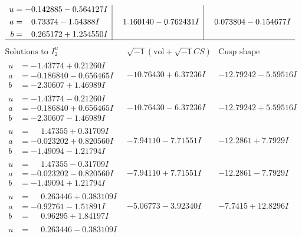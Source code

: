 \documentclass[1p]{elsarticle_modified}
\theoremstyle{definition}
\newcommand{\I}{\sqrt{-1}}
\begin{document}
$$\begin{array}{c|c|c}
\begin{aligned}
u &= -0.142885 - 0.564127 I \\
a &= \phantom{-}0.73374 - 1.54388 I \\
b &= \phantom{-}0.265172 + 1.254550 I\end{aligned}
 & \phantom{-}1.160140 - 0.762431 I & \phantom{-}0.073804 - 0.154677 I\\
 \hline 
 \end{array}$$\newpage$$\begin{array}{c|c|c}  
\text{Solutions to }I^u_{2}& \I (\text{vol} + \sqrt{-1}CS) & \text{Cusp shape}\\
 \hline 
\begin{aligned}
u &= -1.43774 + 0.21260 I \\
a &= -0.186840 - 0.656465 I \\
b &= -2.30607 + 1.46989 I\end{aligned}
 & -10.76430 + 6.37236 I & -12.79242 - 5.59516 I \\ \hline\begin{aligned}
u &= -1.43774 - 0.21260 I \\
a &= -0.186840 + 0.656465 I \\
b &= -2.30607 - 1.46989 I\end{aligned}
 & -10.76430 - 6.37236 I & -12.79242 + 5.59516 I \\ \hline\begin{aligned}
u &= \phantom{-}1.47355 + 0.31709 I \\
a &= -0.023202 + 0.820560 I \\
b &= -1.49094 - 1.21794 I\end{aligned}
 & -7.94110 - 7.71551 I & -12.2861 + 7.7929 I \\ \hline\begin{aligned}
u &= \phantom{-}1.47355 - 0.31709 I \\
a &= -0.023202 - 0.820560 I \\
b &= -1.49094 + 1.21794 I\end{aligned}
 & -7.94110 + 7.71551 I & -12.2861 - 7.7929 I \\ \hline\begin{aligned}
u &= \phantom{-}0.263446 + 0.383109 I \\
a &= -0.92761 - 1.51891 I \\
b &= \phantom{-}0.96295 + 1.84197 I\end{aligned}
 & -5.06773 - 3.92340 I & -7.7415 + 12.8296 I \\ \hline\begin{aligned}
u &= \phantom{-}0.263446 - 0.383109 I \\

\end{aligned}
\end{array}$$
\end{document}
